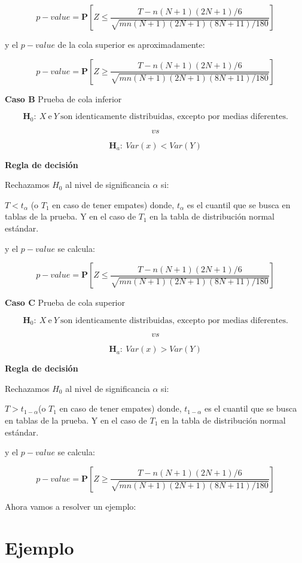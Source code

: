 \documentclass[
  a4paper,
  oneside,
  openany]{book}
\begin{document}
\[ p-value=\mathbf{P}\left[Z\leq\frac{T-n(N+1)(2N+1)/6}{\sqrt{mn(N+1)(2N+1)(8N+11)/180}}\right]\]

y el \(p-value\) de la cola superior es aproximadamente:

\[p-value=\mathbf{P}\left[Z\geq\frac{T-n(N+1)(2N+1)/6}{\sqrt{mn(N+1)(2N+1)(8N+11)/180}}\right]\]

\textbf{Caso B} Prueba de cola inferior

\[\textbf{H}_0: \ X \  \mbox{e} \  Y \ \mbox{son identicamente distribuidas, excepto por medias diferentes.}\]

\[vs\]

\[\textbf{H}_a: \ Var(x) < Var(Y)\]

\textbf{Regla de decisión}

Rechazamos \(H_0\) al nivel de significancia \(\alpha\) si:

\(T<t_\alpha\) (o \(T_1\) en caso de tener empates) donde, \(t_\alpha\) es el cuantil que se busca en tablas de la prueba. Y en el caso de \(T_{1}\) en la tabla de distribución normal estándar.

y el \(p-value\) se calcula:

\[ p-value= \mathbf{P}\left[Z\leq\frac{T-n(N+1)(2N+1)/6}{\sqrt{mn(N+1)(2N+1)(8N+11)/180}}\right]\]

\textbf{Caso C} Prueba de cola superior

\[\textbf{H}_0: \ X \  \mbox{e} \  Y \ \mbox{son identicamente distribuidas, excepto por medias diferentes.}\]

\[vs\]

\[\textbf{H}_a: \ Var(x) > Var(Y)\]

\textbf{Regla de decisión}

Rechazamos \(H_0\) al nivel de significancia \(\alpha\) si:

\(T>t_{1-\alpha}\)(o \(T_1\) en caso de tener empates) donde, \(t_{1-\alpha}\) es el cuantil que se busca en tablas de la prueba. Y en el caso de \(T_{1}\) en la tabla de distribución normal estándar.

y el \(p-value\) se calcula:

\[p-value=\mathbf{P}\left[Z\geq\frac{T-n(N+1)(2N+1)/6}{\sqrt{mn(N+1)(2N+1)(8N+11)/180}}\right]\]

Ahora vamos a resolver un ejemplo:

\hypertarget{ejemplo-7}{%
\section{Ejemplo}\label{ejemplo-7}}
\end{document}

